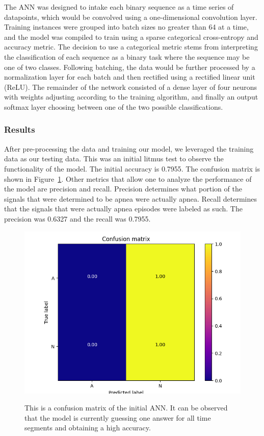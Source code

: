\documentclass[12pt,titlepage]{article}
\begin{document}
The ANN was designed to intake each binary sequence as a time series of datapoints, which would be convolved using a one-dimensional convolution layer. Training
instances were grouped into batch sizes no greater than 64 at a time, and the model was compiled to train using a sparse categorical cross-entropy and accuracy 
metric. The decision to use a categorical metric stems from interpreting the classification of each sequence as a binary task where the sequence may be one of two 
classes. Following batching, the data would be further processed by a normalization layer for each batch and then rectified using a rectified linear unit (ReLU). 
The remainder of the network consisted of a dense layer of four neurons with weights adjusting according to the training algorithm, and finally an output softmax
layer choosing between one of the two possible classifications. 

\subsubsection{Results}
After pre-processing the data and training our model, we leveraged the training data as our testing data. This was an initial litmus test to observe the functionality of the model. The initial accuracy is 0.7955. The confusion matrix is shown in Figure~\ref{fig:cmANN}. Other metrics that allow one to analyze the performance of the model are precision and recall. Precision determines what portion of the signals that were determined to be apnea were actually apnea. Recall determines that the signals that were actually apnea episodes were labeled as such. The precision was 0.6327 and the recall was 0.7955.
\begin{figure}[H]
  \centering
  \includegraphics[width=5in]{NN.png}
  \label{fig:cmANN}
  \caption{This is a confusion matrix of the initial ANN. It can be observed that the model is currently guessing one answer for all time segments and obtaining a high accuracy.}
\end{figure}
\end{document}
